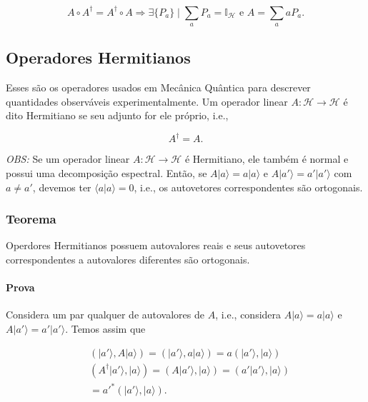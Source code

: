 \documentclass[11pt]{article}
\begin{document}
\begin{equation}
A\circ A^{\dagger}=A^{\dagger}\circ A\Rightarrow \exists{\{P_{a}\}}\mid \sum_{a}P_{a}=\mathbb{I}_{\mathcal{H}}\text{ e }A=\sum_{a}aP_{a}.
\end{equation}

    \subsection{Operadores Hermitianos}\label{operadores-hermitianos}

Esses são os operadores usados em Mecânica Quântica para descrever
quantidades observáveis experimentalmente. Um operador linear
\(A:\mathcal{H}\rightarrow\mathcal{H}\) é dito Hermitiano se seu adjunto
for ele próprio, i.e.,

\begin{equation}
A^{\dagger}=A.
\end{equation}

\emph{OBS:} Se um operador linear
\(A:\mathcal{H}\rightarrow\mathcal{H}\) é Hermitiano, ele também é
normal e possui uma decomposição espectral. Então, se
\(A|a\rangle=a|a\rangle\) e \(A|a'\rangle=a'|a'\rangle\) com
\(a\ne a'\), devemos ter \(\langle a|a\rangle=0\), i.e., os autovetores
correspondentes são ortogonais.

\subsubsection{Teorema}\label{teorema}

Operdores Hermitianos possuem autovalores reais e seus autovetores
correspondentes a autovalores diferentes são ortogonais.

\paragraph{Prova}\label{prova}

Considera um par qualquer de autovalores de \(A\), i.e., considera
\(A|a\rangle=a|a\rangle\) e \(A|a'\rangle=a'|a'\rangle\). Temos assim
que

\begin{align}
& (|a'\rangle,A|a\rangle) = (|a'\rangle,a|a\rangle) = a(|a'\rangle,|a\rangle) \\
& (A^{\dagger}|a'\rangle,|a\rangle)=(A|a'\rangle,|a\rangle) = (a'|a'\rangle,|a\rangle) \\
& = a'^{*}(|a'\rangle,|a\rangle).
\end{align}
\end{document}
